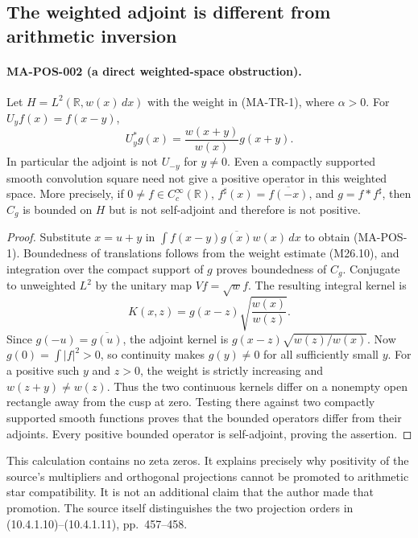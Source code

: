 \subsection{The weighted adjoint is different from arithmetic inversion}

\paragraph{MA-POS-002 (a direct weighted-space obstruction).}
Let $H=L^2(\mathbb R,w(x)\,dx)$ with the weight in (MA-TR-1),
where $\alpha>0$. For $U_yf(x)=f(x-y)$,
\[
 U_y^*g(x)=\frac{w(x+y)}{w(x)}g(x+y).
 \tag{MA-POS-1}
\]
In particular the adjoint is not $U_{-y}$ for $y\ne0$.
Even a compactly supported smooth convolution square need not
give a positive operator in this weighted space. More precisely,
if $0\ne f\in C_c^\infty(\mathbb R)$,
$f^\sharp(x)=\overline{f(-x)}$, and $g=f*f^\sharp$, then
$C_g$ is bounded on $H$ but is not self-adjoint and therefore
is not positive.

\begin{proof}
Substitute $x=u+y$ in
$\int f(x-y)\overline{g(x)}w(x)\,dx$ to obtain
(MA-POS-1). Boundedness of translations follows from the weight
estimate (M26.10), and integration over the compact support of
$g$ proves boundedness of $C_g$.
Conjugate to unweighted $L^2$ by the unitary map
$Vf=\sqrt w f$. The resulting integral kernel is
\[
 K(x,z)=g(x-z)\sqrt{\frac{w(x)}{w(z)}}.
\]
Since $g(-u)=\overline{g(u)}$, the adjoint kernel is
$g(x-z)\sqrt{w(z)/w(x)}$. Now
$g(0)=\int|f|^2>0$, so continuity makes $g(y)\ne0$ for all
sufficiently small $y$. For a positive such $y$ and $z>0$,
the weight is strictly increasing and $w(z+y)\ne w(z)$.
Thus the two continuous kernels differ on a nonempty open
rectangle away from the cusp at zero. Testing there against
two compactly supported smooth functions proves that the
bounded operators differ from their adjoints. Every positive
bounded operator is self-adjoint, proving the assertion.
\end{proof}

This calculation contains no zeta zeros. It explains precisely
why positivity of the source's multipliers and orthogonal
projections cannot be promoted to arithmetic star compatibility.
It is not an additional claim that the author made that promotion.
The source itself distinguishes the two projection orders in
(10.4.1.10)--(10.4.1.11), pp.~457--458.

